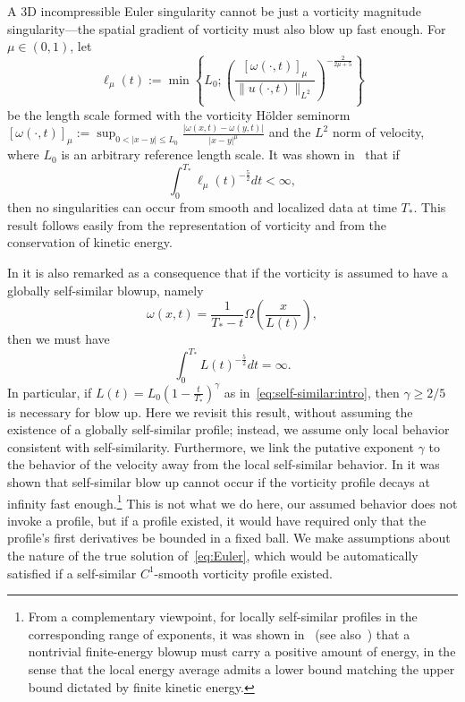 \documentclass[11pt,reqno]{amsproc}
\numberwithin{equation}{section}
\theoremstyle{remark}
\begin{document}
A 3D incompressible Euler singularity cannot be just a vorticity magnitude singularity---the spatial gradient of vorticity must also blow up fast enough. For $\mu \in (0,1)$, let 
\begin{equation*}
\ell_\mu (t) := \min\left \{L_0; \left(\frac{[\omega (\cdot,t)]_{\mu}}{\|u(\cdot, t)\|_{L^2}}\right)^{-\frac{2}{2\mu +5}}\right\}
\end{equation*}
be the length scale formed with the vorticity H\"{o}lder seminorm $[\omega (\cdot, t)]_{\mu} := \sup_{0 < |x-y| \le L_0}\frac{|\omega (x,t)-\omega(y,t)|}{|x-y|^{\mu}}$ and the $L^2$ norm of velocity, where $L_0$ is an arbitrary reference length scale. It was shown in~\cite[Theorem 1, p. 38]{Constantin94a} that if
\begin{equation*}
\int_0^{T_*} \ell_\mu(t)^{-\frac{5}{2}}dt <\infty,
\end{equation*}
then no singularities can occur from smooth and localized data at time $T_*$. This result follows easily from the representation of vorticity 
 and from the conservation of kinetic energy. 
 
 In \cite{Constantin94a} it is also remarked as a consequence that if the vorticity is assumed to have a globally self-similar blowup, namely 
\begin{equation*}
\omega(x,t) = \frac{1}{T_*-t}\Omega\left(\frac{x}{L(t)}\right),
\end{equation*}
then we must have
\begin{equation*}
\int_0^{T_*} L(t)^{-\frac{5}{2}}dt = \infty.
\end{equation*}
In particular, if $L(t) =L_0(1 -\frac{t}{T_*})^\gamma$ as in~\eqref{eq:self-similar:intro}, then $\gamma\geq 2/5$ is necessary for blow up.  Here we revisit this result, without assuming the existence of a globally self-similar profile; instead, we assume only local behavior consistent with self-similarity. Furthermore, we link the putative exponent $\gamma$ to the behavior of the velocity away from the local self-similar behavior. In \cite{Chae07} it was shown that self-similar blow up cannot occur if the vorticity profile decays at infinity fast enough.\footnote{From a complementary viewpoint, for locally self-similar profiles in the corresponding range of exponents, it was shown in~\cite{BronziShvydkoy15} (see also~\cite{Shvydkoy13}) that a nontrivial finite-energy blowup must carry a positive amount of energy, in the sense that the local energy average admits a lower bound matching the upper bound dictated by finite kinetic energy.} This is not what we do here, our assumed behavior does not invoke a profile, but if a profile existed, it would have required only that the profile's first derivatives be bounded in a fixed ball. We  make assumptions about the nature of the true solution of~\eqref{eq:Euler}, which would be automatically satisfied if a self-similar $C^1$-smooth vorticity profile existed.
\end{document}
